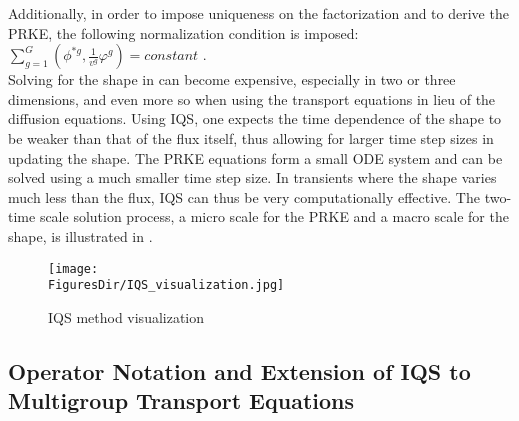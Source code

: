 Additionally, in order to impose uniqueness on the factorization and to derive the PRKE, the following normalization condition is imposed: $\sum_{g=1}^G\left(\phi^{*g},\frac{1}{v^g}\varphi^g\right) = \textit{constant}$ \cite{Dulla2008}. \\

Solving for the shape in  can become expensive, especially in two or three dimensions, and even more so when using the transport equations in lieu of the diffusion equations.  Using IQS, one expects the time dependence of the shape to be weaker than that of the flux itself,  thus allowing for larger time step sizes in updating the shape. The PRKE equations form a small ODE system and can be solved using a much smaller time step size. In transients where the shape varies much less than the flux, IQS can thus be very computationally effective. The two-time scale solution process, a micro scale for the PRKE and a macro scale for the shape, is illustrated in .  

\begin{figure}[!htbp]
\texttt{[image: \\FiguresDir/IQS\_visualization.jpg]}
\caption{IQS method visualization}
\label{fig:iqsviz}
\end{figure}

\subsection{Operator Notation and Extension of IQS to Multigroup Transport Equations}
\label{sect:transport}

